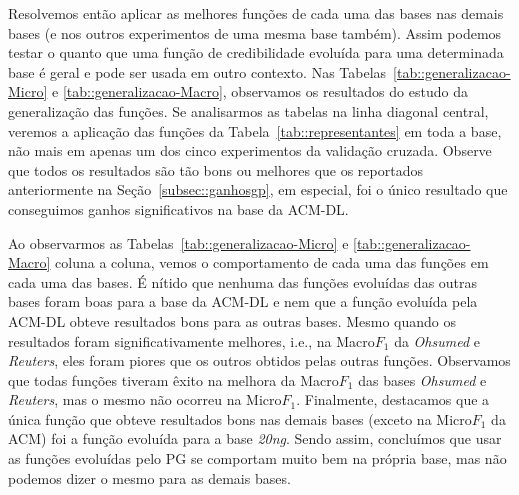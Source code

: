 Resolvemos então aplicar as melhores funções de cada uma das bases nas demais bases (e nos outros experimentos de uma mesma base também). Assim podemos testar o quanto que uma função de credibilidade evoluída para uma determinada base é geral e pode ser usada em outro contexto. Nas Tabelas~\ref{tab::generalizacao-Micro} e \ref{tab::generalizacao-Macro}, observamos os resultados do estudo da generalização das funções. Se analisarmos as tabelas na linha diagonal central, veremos a aplicação das funções da Tabela~\ref{tab::representantes} em toda a base, não mais em apenas um dos cinco experimentos da validação cruzada. Observe que todos os resultados são tão bons ou melhores que os reportados anteriormente na Seção~\ref{subsec::ganhosgp}, em especial, foi o único resultado que conseguimos ganhos significativos na base da \textsc{ACM-DL}.

Ao observarmos as Tabelas~\ref{tab::generalizacao-Micro} e \ref{tab::generalizacao-Macro} coluna a coluna, vemos o comportamento de cada uma das funções em cada uma das bases. É nítido que nenhuma das funções evoluídas das outras bases foram boas para a base da \textsc{ACM-DL} e nem que a função evoluída pela \textsc{ACM-DL} obteve resultados bons para as outras bases. Mesmo quando os resultados foram significativamente melhores, i.e., na Macro$F_1$ da \textit{Ohsumed} e \textit{Reuters}, eles foram piores que os outros obtidos pelas outras funções.
Observamos que todas funções tiveram êxito na melhora da Macro$F_1$ das bases \textit{Ohsumed} e \textit{Reuters}, mas o mesmo não ocorreu na Micro$F_1$.
Finalmente, destacamos que a única função que obteve resultados bons nas demais bases (exceto na Micro$F_1$ da \textsc{ACM}) foi a função evoluída para a base \textit{20ng}.
Sendo assim, concluímos que usar as funções evoluídas pelo \textsc{PG} se comportam muito bem na própria base, mas não podemos dizer o mesmo para as demais bases.

